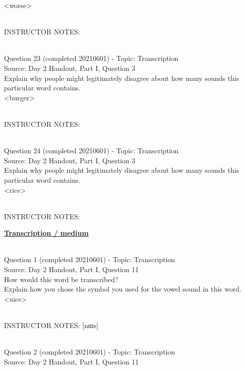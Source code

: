 \documentclass[12pt]{article}
\begin{document}
<worse>


~\\
INSTRUCTOR NOTES: 


~\\

{\large Question 23} (completed 20210601) - Topic: Transcription\\
Source: Day 2 Handout, Part I, Question 3\\

Explain why people might legitimately disagree about how many sounds this particular word contains.\\

<burger>


~\\
INSTRUCTOR NOTES: 


~\\

{\large Question 24} (completed 20210601) - Topic: Transcription\\
Source: Day 2 Handout, Part I, Question 3\\

Explain why people might legitimately disagree about how many sounds this particular word contains.\\

<rice>


~\\
INSTRUCTOR NOTES: 


\newpage\textbf{\underline{\huge Transcription / medium\\}}

~\\

{\large Question 1} (completed 20210601) - Topic: Transcription\\
Source: Day 2 Handout, Part I, Question 11\\

How would this word be transcribed?\\ Explain how you chose the symbol you used for the vowel sound in this word.\\

<nice>


~\\
INSTRUCTOR NOTES: [nɑɪs]


~\\

{\large Question 2} (completed 20210601) - Topic: Transcription\\
Source: Day 2 Handout, Part I, Question 11\\
\end{document}
